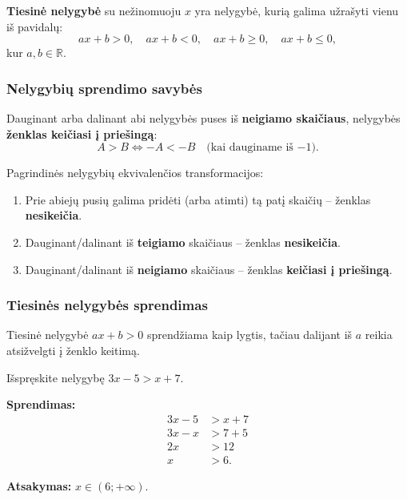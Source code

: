 \begin{definition}
\textbf{Tiesinė nelygybė} su nežinomuoju $x$ yra nelygybė, kurią galima užrašyti vienu iš pavidalų:
\[
ax + b > 0, \quad ax + b < 0, \quad ax + b \geq 0, \quad ax + b \leq 0,
\]
kur $a, b \in \mathbb{R}$.
\end{definition}

\subsubsection{Nelygybių sprendimo savybės}

\begin{tcolorbox}[title=Svarbu prisiminti!, colback=red!5, colframe=red!60!black]
Dauginant arba dalinant abi nelygybės puses iš \textbf{neigiamo skaičiaus}, nelygybės \textbf{ženklas keičiasi į priešingą}:
\[
    A > B \iff -A < -B \quad \text{(kai dauginame iš } {-1}\text{)}.
\]
\end{tcolorbox}

Pagrindinės nelygybių ekvivalenčios transformacijos:
\begin{enumerate}
    \item Prie abiejų pusių galima pridėti (arba atimti) tą patį skaičių – ženklas \textbf{nesikeičia}.
    \item Dauginant/dalinant iš \textbf{teigiamo} skaičiaus – ženklas \textbf{nesikeičia}.
    \item Dauginant/dalinant iš \textbf{neigiamo} skaičiaus – ženklas \textbf{keičiasi į priešingą}.
\end{enumerate}

\subsubsection{Tiesinės nelygybės sprendimas}

Tiesinė nelygybė $ax + b > 0$ sprendžiama kaip lygtis, tačiau dalijant iš $a$ reikia atsižvelgti į ženklo keitimą.

\begin{example}
Išspręskite nelygybę $3x - 5 > x + 7$.

\textbf{Sprendimas:}
\begin{align*}
    3x - 5 &> x + 7 \\
    3x - x &> 7 + 5 \\
    2x &> 12 \\
    x &> 6.
\end{align*}

\textbf{Atsakymas:} $x \in (6; +\infty)$.
\end{example}

